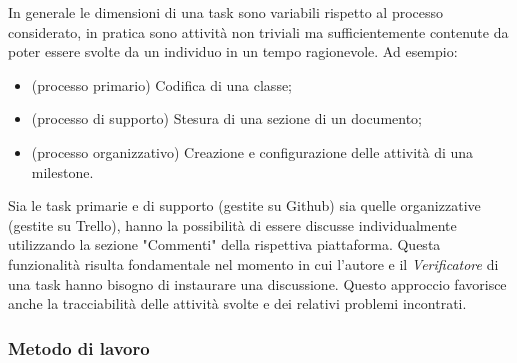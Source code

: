 In generale le dimensioni di una task sono variabili rispetto al processo considerato, in pratica sono attività non triviali ma sufficientemente contenute da poter essere svolte da un individuo in un tempo ragionevole. Ad esempio:
\begin{itemize}
  \item (processo primario) Codifica di una classe;
  \item (processo di supporto) Stesura di una sezione di un documento;
  \item (processo organizzativo) Creazione e configurazione delle attività di una milestone.
\end{itemize}

Sia le task primarie e di supporto (gestite su Github) sia quelle organizzative (gestite su Trello), hanno la possibilità di essere discusse individualmente utilizzando la sezione "Commenti" della rispettiva piattaforma. Questa funzionalità risulta fondamentale nel momento in cui l'autore e il \textit{Verificatore} di una task hanno bisogno di instaurare una discussione. Questo approccio favorisce anche la tracciabilità delle attività svolte e dei relativi problemi incontrati.

\subsubsection{Metodo di lavoro}

